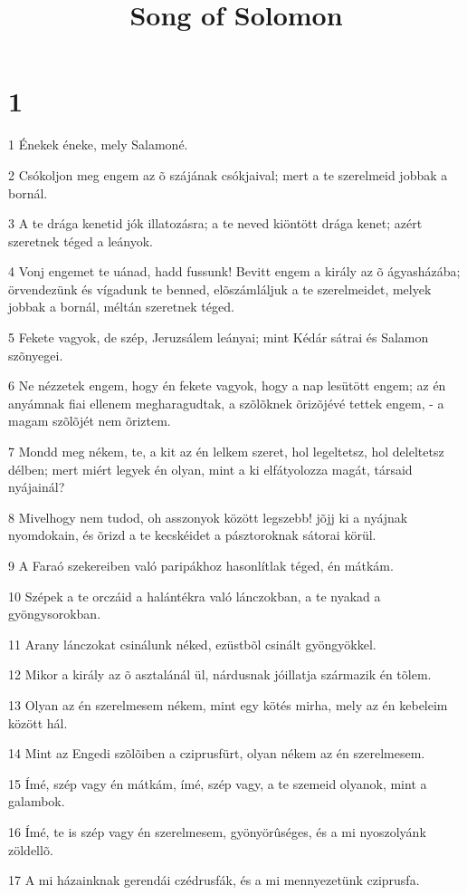 

\title{Song of Solomon}


\chapter{1}

\par 1 Énekek éneke, mely Salamoné.
\par 2 Csókoljon meg engem az õ szájának csókjaival; mert a te szerelmeid jobbak a bornál.
\par 3 A te drága kenetid jók illatozásra; a te neved kiöntött drága kenet; azért szeretnek téged a leányok.
\par 4 Vonj engemet te uánad, hadd fussunk! Bevitt engem a király az õ ágyasházába; örvendezünk  és vígadunk te benned, elõszámláljuk a te szerelmeidet, melyek jobbak a bornál, méltán szeretnek téged.
\par 5 Fekete vagyok, de szép, Jeruzsálem leányai; mint Kédár sátrai és Salamon szõnyegei.
\par 6 Ne nézzetek engem, hogy én fekete vagyok, hogy a nap lesütött engem; az én anyámnak fiai ellenem megharagudtak, a szõlõknek õrizõjévé tettek engem, - a magam szõlõjét nem õriztem.
\par 7 Mondd meg nékem, te, a kit az én lelkem szeret, hol legeltetsz, hol deleltetsz délben; mert miért legyek én olyan, mint a ki elfátyolozza magát, társaid nyájainál?
\par 8 Mivelhogy nem tudod, oh asszonyok között legszebb! jõjj ki a nyájnak nyomdokain, és õrizd a te kecskéidet a pásztoroknak sátorai körül.
\par 9 A Faraó szekereiben való paripákhoz hasonlítlak téged, én mátkám.
\par 10 Szépek a te orczáid a halántékra való lánczokban, a te nyakad a gyöngysorokban.
\par 11 Arany lánczokat csinálunk néked, ezüstbõl csinált gyöngyökkel.
\par 12 Mikor a király az õ asztalánál ül, nárdusnak jóillatja származik én tõlem.
\par 13 Olyan az én szerelmesem nékem, mint egy kötés mirha, mely az én kebeleim között hál.
\par 14 Mint az Engedi szõlõiben a cziprusfürt, olyan nékem az én szerelmesem.
\par 15 Ímé, szép vagy én mátkám, ímé, szép vagy, a te szemeid olyanok, mint a galambok.
\par 16 Ímé, te is szép vagy én szerelmesem, gyönyörûséges, és a mi nyoszolyánk zöldellõ.
\par 17 A mi házainknak gerendái czédrusfák, és a mi mennyezetünk cziprusfa.

